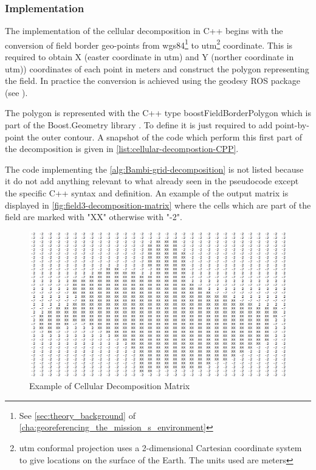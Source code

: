 \subsubsection{Implementation} %
\label{ssub:implementation}
The implementation of the cellular decomposition in C++ begins with the conversion of field border geo-points from \acrshort{wgs84}\footnote{See \autoref{sec:theory_background} of \autoref{cha:georeferencing_the_mission_s_environment}} to \acrshort{utm}\footnote{\acrfull{utm} conformal projection uses a 2-dimensional Cartesian coordinate system to give locations on the surface of the Earth. The units used are meters} coordinate. This is required to obtain X (easter coordinate in \acrshort{utm}) and Y (norther coordinate in \acrshort{utm})) coordinates of each point in meters and construct the polygon representing the field.
In practice the conversion is achieved using the \textsf{geodesy} ROS package (see \cite{geodesyROS}).\par
The polygon is represented with the C++ type \textsf{boostFieldBorderPolygon} which is part of the \textsf{Boost.Geometry} library \cite{boostGeometryLib}. To define it is just required to add point-by-point the outer contour. A snapshot of the code which perform this first part of the decomposition is given in \autoref{list:cellular-decompostion-CPP}.\par
The code implementing the \autoref{alg:Bambi-grid-decomposition} is not listed because it do not add anything relevant to what already seen in the pseudocode except the specific C++ syntax and definition. An example of the output matrix is displayed in \autoref{fig:field3-decomposition-matrix} where the cells which are part of the field are marked with "XX" otherwise with "-2".

\begin{figure}[ht]
    \centering
    \includegraphics[width=1\textwidth]{figures/Field3/Field3-decomposition-matrix.png}
    \caption{Example of Cellular Decomposition Matrix}
    \label{fig:field3-decomposition-matrix}
\end{figure}

